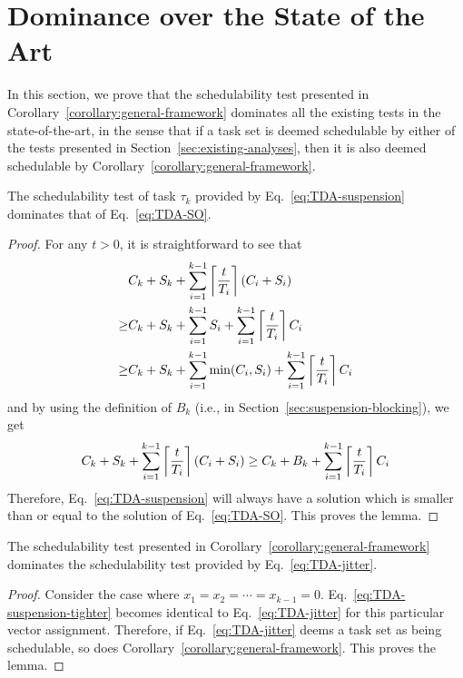 \section{Dominance over the State of the Art}
\label{sec:dominance}

In this section, we prove that the schedulability test presented in Corollary~\ref{corollary:general-framework} dominates all the existing tests in the state-of-the-art, in the sense that if a task set is deemed schedulable by either of the tests presented in Section~\ref{sec:existing-analyses}, then it is also deemed schedulable by Corollary~\ref{corollary:general-framework}.

\begin{Lemma}
\label{lem:dominance_oblivious}
  The schedulability test of task $\tau_k$ provided by
  Eq.~\eqref{eq:TDA-suspension} dominates that of
  Eq.~\eqref{eq:TDA-SO}.
\end{Lemma}
\begin{proof}
For any $t > 0$, it is straightforward to see that
\begin{align*}
& C_k + S_k + \sum_{i=1}^{k-1}\left\lceil{\frac{t}{T_i}}\right\rceil (C_i + S_i) \\
 \geq & C_k + S_k + \sum_{i=1}^{k-1} S_i + \sum_{i=1}^{k-1}\left\lceil{\frac{t}{T_i}}\right\rceil C_i\\
 \geq & C_k + S_k + \sum_{i=1}^{k-1} \min(C_i, S_i) + \sum_{i=1}^{k-1}\left\lceil{\frac{t}{T_i}}\right\rceil C_i
\end{align*}
and by using the definition of $B_k$ (i.e., in Section~\ref{sec:suspension-blocking}), we get
\begin{align*}
C_k + S_k + \sum_{i=1}^{k-1}\left\lceil{\frac{t}{T_i}}\right\rceil (C_i + S_i) \geq C_k + B_k + \sum_{i=1}^{k-1}\left\lceil{\frac{t}{T_i}}\right\rceil C_i
\end{align*}
Therefore, Eq.~\eqref{eq:TDA-suspension} will always have a solution which is smaller than or equal to the solution of Eq.~\eqref{eq:TDA-SO}. This proves the lemma.
\end{proof}

\begin{Lemma}
  \label{lem:dominance_jitter}
  The schedulability test presented in
  Corollary~\ref{corollary:general-framework} dominates the
  schedulability test provided by Eq.~\eqref{eq:TDA-jitter}.
\end{Lemma}
\begin{proof}
  Consider the case where $x_1=x_2=\cdots=x_{k-1}=0$. Eq.~\eqref{eq:TDA-suspension-tighter} becomes identical to Eq.~\eqref{eq:TDA-jitter} for this particular vector assignment. Therefore, if Eq.~\eqref{eq:TDA-jitter} deems a task set as being schedulable, so does Corollary~\ref{corollary:general-framework}. This proves the lemma. 
\end{proof}
  
